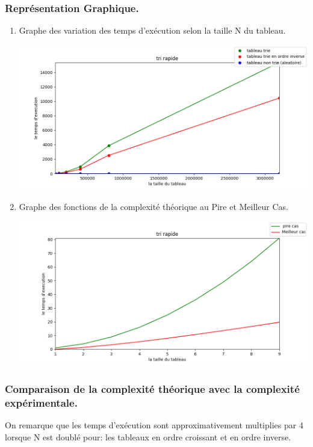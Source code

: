 \documentclass[12pt]{article}
\begin{document}
\subsubsection{Représentation Graphique.}
\begin{enumerate}
	\item Graphe des variation des temps d'exécution selon la taille N du tableau.

	\includegraphics[width=1\textwidth]{graph/tri_rapide.png}
	
	
	\item Graphe des fonctions de la complexité théorique au Pire et Meilleur Cas.
	
	\includegraphics[width=1\textwidth]{graph/tri_rapide_teorique.png}
	
\end{enumerate}

\subsubsection{Comparaison de la complexité théorique avec la complexité expérimentale.}

 On remarque que les temps d'exécution sont approximativement multiplies par 4 lorsque N est doublé pour: \color{blue} les tableaux en ordre croissant et en ordre inverse.\\
\color{black}
\end{document}
